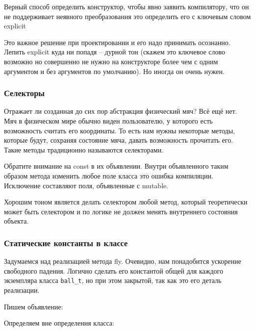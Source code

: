 \documentclass[a4paper,12pt,oneside]{article}
\begin{document}


Верный способ определить конструктор, чтобы явно заявить компилятору, что он не поддерживает неявного преобразования это определить его с ключевым словом explicit



Это важное решение при проектировании и его надо принимать осознанно. Лепить explicit куда ни попадя -- дурной тон (скажем это ключевое слово возможно но совершенно не нужно на конструкторе более чем с одним аргументом и без аргументов по умолчанию). Но иногда он очень нужен.

\subsubsection{Селекторы}

Отражает ли созданная до сих пор абстракция физический мяч? Всё ещё нет. Мяч в физическом мире обычно виден пользователю, у которого есть возможность считать его координаты. То есть нам нужны некоторые методы, которые будут, сохраняя состояние мяча, давать возможность прочитать его. Такие методы традиционно называются селекторами.



Обратите внимание на const в их объявлении. Внутри объявленного таким образом метода изменить любое поле класса это ошибка компиляции. Исключение составляют поля, объявленные с mutable.

Хорошим тоном является делать селектором любой метод, который теоретически может быть селектором и по логике не должен менять внутреннего состояния объекта.

\subsubsection{Статические константы в классе}

Задумаемся над реализацией метода fly. Очевидно, нам понадобится ускорение свободного падения. Логично сделать его константой общей для каждого экземпляра класса \lstinline!ball_t!, но при этом закрытой, так как это его деталь реализации.

Пишем объявление:



Определяем вне определения класса:
\end{document}
